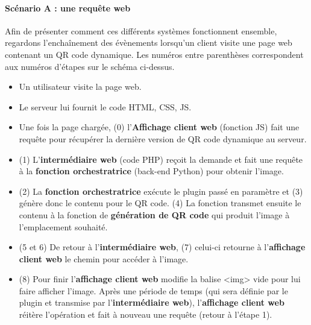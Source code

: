 \documentclass[a4paper,12pt]{article}
\begin{document}
\paragraph{Scénario A : une requête web}
    \label{scen:1A}
\noindent Afin de présenter comment ces différents systèmes fonctionnent ensemble, regardons l'enchaînement des évènements lorsqu'un client visite une page web contenant un QR code dynamique. Les numéros entre parenthèses correspondent aux numéros d'étapes sur le schéma ci-dessus.\\
  \newpage
\begin{itemize}
  \item Un utilisateur visite la page web.
  \item Le serveur lui fournit le code HTML, CSS, JS.
  \item Une fois la page chargée, (0) l'\textbf{Affichage client web} (fonction JS) fait une requête pour récupérer la dernière version de QR code dynamique au serveur.
  \item (1) L'\textbf{intermédiaire web} (code PHP) reçoit la demande et fait une requête à la \textbf{fonction orchestratrice} (back-end Python) pour obtenir l'image.
  \item (2) La \textbf{fonction orchestratrice} exécute le plugin passé en paramètre et (3) génère donc le contenu pour le QR code. (4) La fonction transmet ensuite le contenu à la fonction de \textbf{génération de QR code} qui produit l'image à l'emplacement souhaité.
  \item (5 et 6) De retour à l'\textbf{intermédiaire web}, (7) celui-ci retourne à l'\textbf{affichage client web} le chemin pour accéder à l'image.
  \item (8) Pour finir l'\textbf{affichage client web} modifie la balise <img> vide pour lui faire afficher l'image. Après une période de temps (qui sera définie par le plugin et transmise par l'\textbf{intermédiaire web}), l'\textbf{affichage client web} réitère l'opération et fait à nouveau une requête (retour à l'étape 1).\\
\end{itemize}
\end{document}
